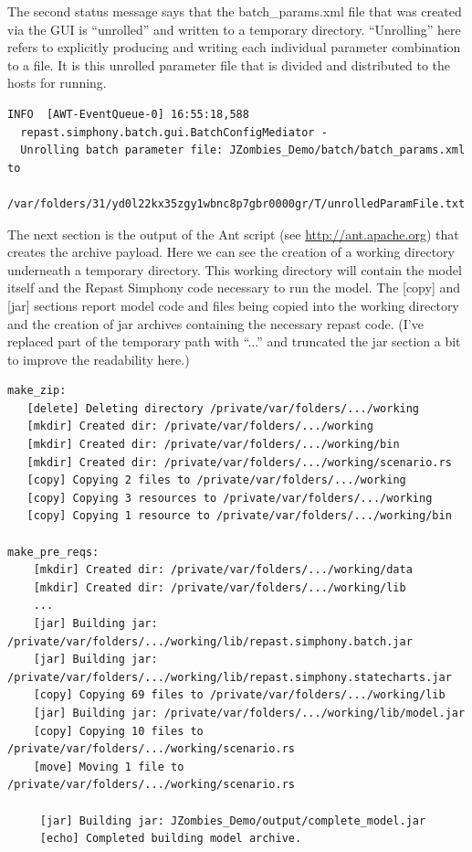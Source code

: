 \documentclass[11pt]{amsart}
\begin{document}
The second status message says that the batch\_params.xml file that was created via the GUI is ``unrolled'' and written to a temporary directory. ``Unrolling'' here refers to explicitly producing and writing each individual parameter combination to a file. It is this unrolled parameter file that is divided and distributed to the hosts for running.

\begin{verbatim}
INFO  [AWT-EventQueue-0] 16:55:18,588
  repast.simphony.batch.gui.BatchConfigMediator -
  Unrolling batch parameter file: JZombies_Demo/batch/batch_params.xml to
  /var/folders/31/yd0l22kx35zgy1wbnc8p7gbr0000gr/T/unrolledParamFile.txt
\end{verbatim}

The next section is the output of the Ant script (see \href{http://ant.apache.org}{http://ant.apache.org}) that creates the archive payload. Here we can see the creation of a working directory underneath a temporary directory. This working directory will contain the model itself and the Repast Simphony code necessary to run the model.  The [copy] and [jar] sections report model code and files being copied into the working directory and the creation of jar archives containing the necessary repast code. (I've replaced part of the temporary path with ``...'' and truncated the jar section a bit to improve the readability here.)

\begin{verbatim}
make_zip:
   [delete] Deleting directory /private/var/folders/.../working
   [mkdir] Created dir: /private/var/folders/.../working
   [mkdir] Created dir: /private/var/folders/.../working/bin
   [mkdir] Created dir: /private/var/folders/.../working/scenario.rs
   [copy] Copying 2 files to /private/var/folders/.../working
   [copy] Copying 3 resources to /private/var/folders/.../working
   [copy] Copying 1 resource to /private/var/folders/.../working/bin

make_pre_reqs:
    [mkdir] Created dir: /private/var/folders/.../working/data
    [mkdir] Created dir: /private/var/folders/.../working/lib
    ...
    [jar] Building jar: /private/var/folders/.../working/lib/repast.simphony.batch.jar
    [jar] Building jar: /private/var/folders/.../working/lib/repast.simphony.statecharts.jar
    [copy] Copying 69 files to /private/var/folders/.../working/lib
    [jar] Building jar: /private/var/folders/.../working/lib/model.jar
    [copy] Copying 10 files to /private/var/folders/.../working/scenario.rs
    [move] Moving 1 file to /private/var/folders/.../working/scenario.rs

     [jar] Building jar: JZombies_Demo/output/complete_model.jar
     [echo] Completed building model archive.
\end{verbatim}
\end{document}
